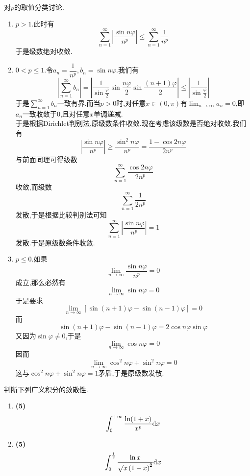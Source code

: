 \documentclass{ctexart}
\begin{document}
\begin{solution}
    对$p$的取值分类讨论.
    \begin{enumerate}[label=\tbf{\roman*.},topsep=0pt,parsep=0pt,itemsep=0pt,partopsep=0pt,leftmargin=*]
        \item $p>1$.此时有
            \[\sum_{n=1}^{\infty}\left|\dfrac{\sin n\varphi}{n^p}\right|\leqslant
            \sum_{n=1}^{\infty}\dfrac{1}{n^p}\]
            于是级数绝对收敛.
        \item $0<p\leqslant 1$.令$a_n=\dfrac{1}{n^p},b_n=\sin n\varphi$.我们有
            \[\left|\sum_{n=1}^{\infty}b_n\right|=\left|\dfrac{1}{\sin\frac{\varphi}{2}}\sin\dfrac{n\varphi}{2}\sin\dfrac{(n+1)\varphi}{2}\right|\leqslant\left|\dfrac{1}{\sin\frac{\varphi}{2}}\right|\]
            于是$\displaystyle\sum_{n=1}^{\infty}b_n$一致有界.而当$p>0$时,对任意$x\in(0,\pi)$有$\displaystyle\lim_{n\to\infty}a_n=0$,即$a_n$一致收敛于$0$,且对任意$x$单调递减.\\
            于是根据Dirichlet判别法,原级数条件收敛.现在考虑该级数是否绝对收敛.我们有
            \[\left|\dfrac{\sin n\varphi}{n^p}\right|\geqslant\dfrac{\sin^2n\varphi}{n^p}=\dfrac{1-\cos 2n\varphi}{2n^p}\]
            与前面同理可得级数
            \[\sum_{n=1}^{\infty}\dfrac{\cos 2n\varphi}{2n^p}\]
            收敛,而级数
            \[\sum_{n=1}^{\infty}\dfrac{1}{2n^p}\]
            发散,于是根据比较判别法可知
            \[\sum_{n=1}^{\infty}\left|\dfrac{\sin n\varphi}{n^p}\right|=1\]
            发散.于是原级数条件收敛.
        \item $p\leqslant 0$.如果
            \[\lim_{n\to\infty}\dfrac{\sin n\varphi}{n^p}=0\]
            成立,那么必然有
            \[\lim_{n\to\infty}\sin n\varphi=0\]
            于是要求
            \[\lim_{n\to\infty}\left[\sin (n+1)\varphi-\sin(n-1)\varphi\right]=0\]
            而
            \[\sin (n+1)\varphi-\sin (n-1)\varphi=2\cos n\varphi\sin\varphi\]
            又因为$\sin\varphi\neq0$,于是
            \[\lim_{n\to\infty}\cos n\varphi=0\]
            因而
            \[\lim_{n\to\infty}\cos^2 n\varphi+\sin^2 n\varphi=0\]
            这与$\cos^2 n\varphi+\sin^2 n\varphi=1$矛盾,于是原级数发散.
    \end{enumerate}
\end{solution}
\begin{problem}[6.(10\songti{分})]
    判断下列广义积分的敛散性.
    \begin{enumerate}[label=\tbf{(\arabic*)},topsep=0pt,parsep=0pt,itemsep=0pt,partopsep=0pt]
        \item \textbf{(5)}
            \[\int_0^{+\infty}\dfrac{\ln(1+x)}{x^p}\mathrm{d} x\]
        \item \textbf{(5)}
            \[\int_0^{\frac12}\dfrac{\ln x}{\sqrt{x}\left(1-x\right)^2}\mathrm{d} x\]

    \end{enumerate}
\end{problem}
\end{document}
